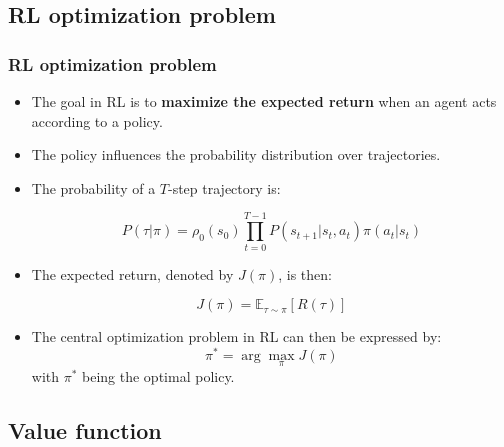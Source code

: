 \documentclass[10pt]{beamer}
\newcommand{\E}{{\mathbb E}}
\begin{document}

\subsection{RL optimization problem}

\begin{frame}

	\frametitle{RL optimization problem}

		\begin{itemize}
			\item The goal in RL is to \textbf{maximize the expected return} when an agent acts according to a policy.
			\item The policy influences the probability distribution over trajectories.
		\item The probability of a $T$-step trajectory is:

			\begin{equation}
				P(\tau|\pi) = \rho_0 (s_0) \prod_{t=0}^{T-1} P(s_{t+1} | s_t, a_t) \pi(a_t | s_t)
			\end{equation}
		
		
		\item The expected return, denoted by $J(\pi)$, is then:

			\begin{equation}
			J(\pi) = \E_{\tau\sim \pi}{[R(\tau)]}
			\label{eq:loss}
			\end{equation}

		\item The central optimization problem in RL can then be expressed by:
			\begin{equation}
			\pi^* = \arg \max_{\pi} J(\pi)
			\label{eq:max_loss}
			\end{equation}
				with $\pi^*$ being the optimal policy.
		\end{itemize}
		
\end{frame}


\subsection{Value function}
\end{document}
